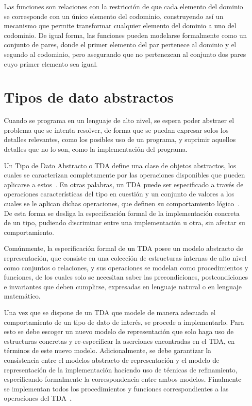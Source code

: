 \begin{description}[leftmargin=!,labelwidth=\widthof{\bfseries Multiconjunto}]
  \item [Función] Las funciones son relaciones con la restricción de que cada
  elemento del dominio se corresponde con un único elemento del codominio,
  construyendo así un mecanismo que permite transformar cualquier elemento del
  dominio a uno del codominio. De igual forma, las funciones pueden modelarse
  formalmente como un conjunto de pares, donde el primer elemento del par
  pertenece al dominio y el segundo al codominio, pero asegurando que no
  pertenezcan al conjunto dos pares cuyo primer elemento sea igual.

\end{description}

\section{Tipos de dato abstractos} \label{tda1}

Cuando se programa en un lenguaje de alto nivel, se espera poder abstraer el
problema que se intenta resolver, de forma que se puedan expresar solos los
detalles relevantes, como los posibles uso de un programa, y suprimir aquellos
detalles que no lo son, como la implementación del programa.

Un Tipo de Dato Abstracto o TDA define una clase de objetos abstractos, los
cuales se caracterizan completamente por las operaciones disponibles que pueden
aplicarse a estos~\cite{liskov}. En otras palabras, un TDA puede ser
especificado a través de operaciones características del tipo en cuestión y un
conjunto de valores a los cuales se le aplican dichas operaciones, que definen
su comportamiento lógico~\cite{dalewalker}. De esta forma se desliga la
especificación formal de la implementación concreta de un tipo, pudiendo
discriminar entre una implementación u otra, sin afectar su comportamiento.

Comúnmente, la especificación formal de un TDA posee un modelo abstracto de
representación, que consiste en una colección de estructuras internas de alto
nivel como conjuntos o relaciones, y sus operaciones se modelan como
procedimientos y funciones, de los cuales solo se necesitan saber las
precondiciones, postcondiciones e invariantes que deben cumplirse, expresadas
en lenguaje natural o en lenguaje matemático.

Una vez que se dispone de un TDA que modele de manera adecuada el
comportamiento de un tipo de dato de interés, se procede a implementarlo. Para
esto se debe escoger un nuevo modelo de representación que solo haga uso de
estructuras concretas y re-especificar la aserciones encontradas en el TDA, en
términos de este nuevo modelo. Adicionalmente, se debe garantizar la
consistencia entre el modelos abstracto de representación y el modelo de
representación de la implementación haciendo uso de técnicas de refinamiento,
especificando formalmente la correspondencia entre ambos modelos. Finalmente
se implementan todos los procedimientos y funciones correspondientes a las
operaciones del TDA~\cite{ravelo}.


